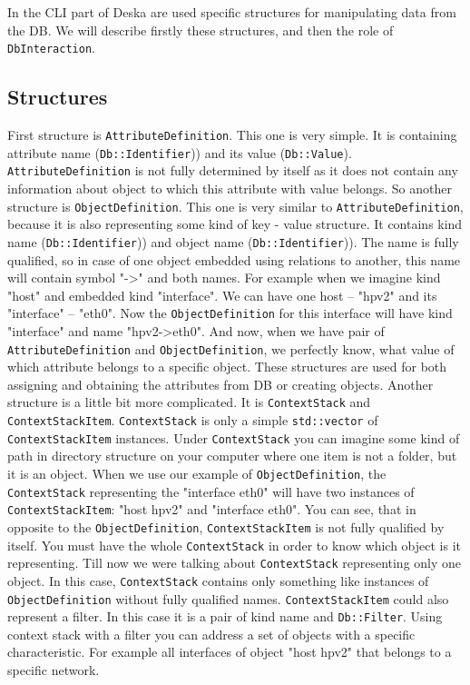 \documentclass[deska]{subfiles}
\begin{document}
In the CLI part of Deska are used specific structures for manipulating data from the DB. We will describe firstly 
these structures, and then the role of {\tt DbInteraction}.

\subsection{Structures}

First structure is {\tt AttributeDefinition}. This one is very simple. It is containing attribute name ({\tt Db::Identifier}))
and its value ({\tt Db::Value}). {\tt AttributeDefinition} is not fully determined by itself as it 
does not contain any information about object to which this attribute with value belongs. So another structure is {\tt ObjectDefinition}.
This one is very similar to {\tt AttributeDefinition}, because it is also representing some kind of 
key - value structure. It contains kind name ({\tt Db::Identifier})) and object name ({\tt Db::Identifier})). The name 
is fully qualified, so in case of one object embedded using relations to another, this name will contain symbol "->" 
and both names. For example when we imagine kind "host" and embedded kind "interface". We can have one host -- "hpv2" 
and its "interface" -- "eth0". Now the {\tt ObjectDefinition} for this interface will have kind "interface" and name 
"hpv2->eth0". And now, when we have pair of {\tt AttributeDefinition} and {\tt ObjectDefinition}, we perfectly know, 
what value of which attribute belongs to a specific object. These structures are used for both assigning and obtaining 
the attributes from DB or creating objects. Another structure is a little bit more complicated. It is {\tt ContextStack}
and {\tt ContextStackItem}. {\tt ContextStack} is only a simple {\tt std::vector} of {\tt ContextStackItem} instances.
Under {\tt ContextStack} you can imagine some kind of path in directory structure on your computer where one item is not
a folder, but it is an object. When we use our example of {\tt ObjectDefinition}, the {\tt ContextStack} representing
the "interface eth0" will have two instances of {\tt ContextStackItem}: "host hpv2" and "interface eth0". You can see,
that in opposite to the {\tt ObjectDefinition}, {\tt ContextStackItem} is not fully qualified by itself. You must have
the whole {\tt ContextStack} in order to know which object is it representing. Till now we were talking about
{\tt ContextStack} representing only one object. In this case, {\tt ContextStack} contains only something like
instances of {\tt ObjectDefinition} without fully qualified names. {\tt ContextStackItem} could also represent a filter.
In this case it is a pair of kind name and {\tt Db::Filter}. Using context stack with a filter you can address a set of
objects with a specific characteristic. For example all interfaces of object "host hpv2" that belongs to a specific
network.
\end{document}
